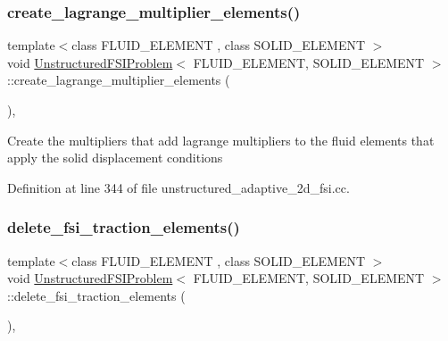 \subsubsection{\texorpdfstring{create\+\_\+lagrange\+\_\+multiplier\+\_\+elements()}{create\_lagrange\_multiplier\_elements()}}
{\footnotesize\ttfamily template$<$class F\+L\+U\+I\+D\+\_\+\+E\+L\+E\+M\+E\+NT , class S\+O\+L\+I\+D\+\_\+\+E\+L\+E\+M\+E\+NT $>$ \\
void \hyperlink{classUnstructuredFSIProblem}{Unstructured\+F\+S\+I\+Problem}$<$ F\+L\+U\+I\+D\+\_\+\+E\+L\+E\+M\+E\+NT, S\+O\+L\+I\+D\+\_\+\+E\+L\+E\+M\+E\+NT $>$\+::create\+\_\+lagrange\+\_\+multiplier\+\_\+elements (\begin{DoxyParamCaption}{ }\end{DoxyParamCaption})\hspace{0.3cm}{\ttfamily [inline]}, {\ttfamily [private]}}

Create the multipliers that add lagrange multipliers to the fluid elements that apply the solid displacement conditions 

Definition at line 344 of file unstructured\+\_\+adaptive\+\_\+2d\+\_\+fsi.\+cc.

\mbox{\label{classUnstructuredFSIProblem_a94b06aac5a09774894dfab4acd972c31}} 
\subsubsection{\texorpdfstring{delete\+\_\+fsi\+\_\+traction\+\_\+elements()}{delete\_fsi\_traction\_elements()}}
{\footnotesize\ttfamily template$<$class F\+L\+U\+I\+D\+\_\+\+E\+L\+E\+M\+E\+NT , class S\+O\+L\+I\+D\+\_\+\+E\+L\+E\+M\+E\+NT $>$ \\
void \hyperlink{classUnstructuredFSIProblem}{Unstructured\+F\+S\+I\+Problem}$<$ F\+L\+U\+I\+D\+\_\+\+E\+L\+E\+M\+E\+NT, S\+O\+L\+I\+D\+\_\+\+E\+L\+E\+M\+E\+NT $>$\+::delete\+\_\+fsi\+\_\+traction\+\_\+elements (\begin{DoxyParamCaption}{ }\end{DoxyParamCaption})\hspace{0.3cm}{\ttfamily [inline]}, {\ttfamily [private]}}



